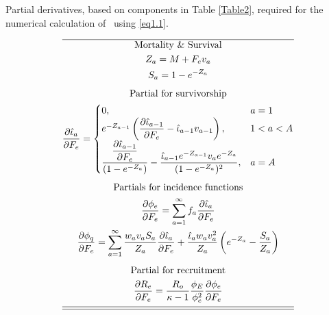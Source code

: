\begin{table}
  \centering
\caption{Partial derivatives, based on components in Table
\ref{Table2}, required for the numerical calculation of \fmsy\ using \eqref{eq1.1}.}\label{Table3} \tableEq
    \begin{gather}
        \hline
        \mbox{Mortality \& Survival} \nonumber \\
        Z_{a}=M+F_ev_a \label{T3.1} \\
        S_{a}=1-e^{-Z_a}\label{T3.2}\\[1ex]
        \mbox{Partial for survivorship} \nonumber \\
        \frac{\partial \hat{\iota}_a}{\partial F_e} =
        \begin{cases}
          0,& a=1 \label{T3.3}\\
          e^{-Z_{a-1}}\left(\dfrac{\partial \hat{\iota}_{a-1}}{\partial F_e}
           -\hat{\iota}_{a-1}v_{a-1}\right),& 1<a<A\\
           \dfrac{\dfrac{\partial \hat{\iota}_{a-1}}{\partial F_e}}
           {(1-e^{-Z_a})} -
           \dfrac{\hat{\iota}_{a-1} e^{-Z_{a-1}} v_a e^{-Z_a}}
           {(1-e^{-Z_a})^2}, &a=A
        \end{cases} \\[1ex]
        \mbox{Partials for incidence functions} \nonumber \\
        \frac{\partial \phi_e}{\partial F_e}=
            \sum_{a=1}^\infty f_a \frac{\partial \hat{\iota}_a}{\partial F_e} \label{T3.4}\\
        \frac{\partial \phi_q}{\partial F_e}=
            \sum_{a=1}^\infty \frac{w_av_a S_a}{Z_a}
             \frac{\partial \hat{\iota}_a}{\partial F_e}
             +\frac{\hat{\iota}_a w_av_a^2}{Z_a}\left(e^{-Z_a}-\frac{S_a}{Z_a} \right) \label{T3.5}\\[1ex]
        \mbox{Partial for recruitment} \nonumber\\
        \frac{\partial R_e}{\partial F_e}=\frac{R_o}{\kappa-1}
        \frac{\phi_E}{\phi_e^2} \frac{\partial \phi_e}{\partial
        F_e} \label{T3.6}\\[1ex]
        \hline \hline \nonumber
    \end{gather}

    \normalEq
\end{table}
	
